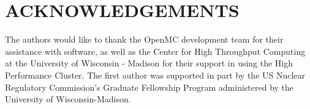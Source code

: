 \documentclass[letterpaper]{physor2024}
\begin{document}
\section*{ACKNOWLEDGEMENTS}
The authors would like to thank the OpenMC development team for their assistance with software, as well as the Center for High Throughput Computing at the University of Wisconsin - Madison for their support in using the High Performance Cluster. The first author was supported in part by the US Nuclear Regulatory Commission's Graduate Fellowship Program administered by the University of Wisconsin-Madison.




\end{document}
